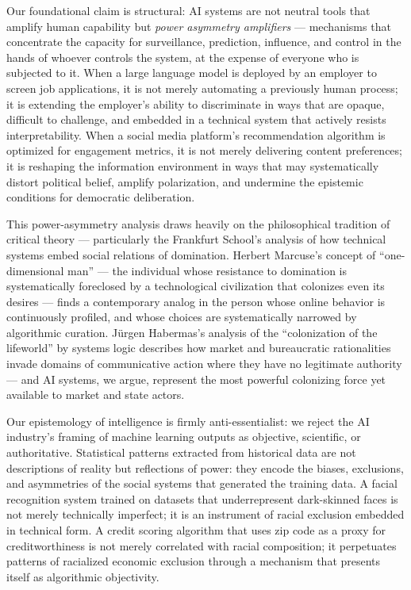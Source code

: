 Our foundational claim is structural: AI systems are not neutral tools
that amplify human capability but \emph{power asymmetry amplifiers} ---
mechanisms that concentrate the capacity for surveillance, prediction,
influence, and control in the hands of whoever controls the system, at
the expense of everyone who is subjected to it. When a large language
model is deployed by an employer to screen job applications, it is not
merely automating a previously human process; it is extending the
employer's ability to discriminate in ways that are opaque, difficult to
challenge, and embedded in a technical system that actively resists
interpretability. When a social media platform's recommendation
algorithm is optimized for engagement metrics, it is not merely
delivering content preferences; it is reshaping the information
environment in ways that may systematically distort political belief,
amplify polarization, and undermine the epistemic conditions for
democratic deliberation.

This power-asymmetry analysis draws heavily on the philosophical
tradition of critical theory --- particularly the Frankfurt School's
analysis of how technical systems embed social relations of domination.
Herbert Marcuse's concept of ``one-dimensional man'' --- the individual
whose resistance to domination is systematically foreclosed by a
technological civilization that colonizes even its desires --- finds a
contemporary analog in the person whose online behavior is continuously
profiled, and whose choices are systematically narrowed by algorithmic
curation. Jürgen Habermas's analysis of the ``colonization of the
lifeworld'' by systems logic describes how market and bureaucratic
rationalities invade domains of communicative action where they have no
legitimate authority --- and AI systems, we argue, represent the most
powerful colonizing force yet available to market and state actors.

Our epistemology of intelligence is firmly anti-essentialist: we reject
the AI industry's framing of machine learning outputs as objective,
scientific, or authoritative. Statistical patterns extracted from
historical data are not descriptions of reality but reflections of
power: they encode the biases, exclusions, and asymmetries of the social
systems that generated the training data. A facial recognition system
trained on datasets that underrepresent dark-skinned faces is not merely
technically imperfect; it is an instrument of racial exclusion embedded
in technical form. A credit scoring algorithm that uses zip code as a
proxy for creditworthiness is not merely correlated with racial
composition; it perpetuates patterns of racialized economic exclusion
through a mechanism that presents itself as algorithmic objectivity.

